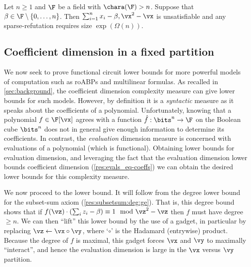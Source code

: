 \documentclass{toc}
\begin{document}
\begin{corollarywp}
        Let $n\ge 1$ and $\F$ be a field with $\chara(\F)>n$.  Suppose that $\beta\in \F\setminus\{0,\ldots,n\}$.  Then $\sum_{i=1}^n x_i-\beta,\vx^2-\vx$ is unsatisfiable and any sparse-\lIPS refutation requires size $\exp(\Omega(n))$.
\end{corollarywp}

\subsection{Coefficient dimension in a fixed partition}\label{sec:evaluation}

We now seek to prove functional circuit lower bounds for more powerful models of computation such as roABPs and multilinear formulas.  As recalled in \autoref{sec:background}, the coefficient dimension complexity measure can give lower bounds for such models.  However, by definition it is a \emph{syntactic} measure as it speaks about the coefficients of a polynomial.  Unfortunately, knowing that a polynomial $f\in\F[\vx]$ agrees with a function $\hat{f}:\bits^n\to\F$ on the Boolean cube $\bits^n$ does not in general give enough information to determine its coefficients.  In contrast, the \emph{evaluation} dimension measure is concerned with evaluations of a polynomial (which is functional).  Obtaining lower bounds for evaluation dimension, and leveraging the fact that the evaluation dimension lower bounds coefficient dimension (\autoref{res:evals_eq-coeffs}) we can obtain the desired lower bounds for this complexity measure.

We now proceed to the lower bound.  It will follow from the degree lower bound for the subset-sum axiom (\autoref{res:subsetsum:deg:ge}).  That is, this degree bound shows that if $f(\vz)\cdot(\sum_i z_i-\beta)\equiv 1\mod \vz^2-\vz$ then $f$ must have degree $\ge n$.  We can then ``lift'' this lower bound by the use of a gadget, in particular by replacing $\vz\leftarrow \vx\circ \vy$, where `$\circ$' is the Hadamard
%
(entrywise)   %
product.  Because the degree of $f$ is maximal, this gadget forces $\vx$ and $\vy$ to maximally ``interact'', and hence the evaluation dimension is large in the $\vx$ versus $\vy$ partition.
\end{document}
